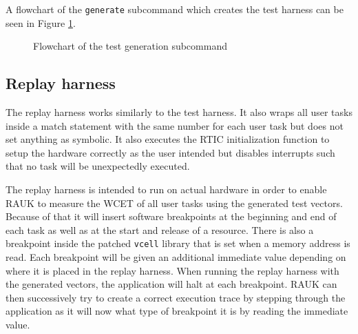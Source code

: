 A flowchart of the \texttt{generate} subcommand which creates the test harness
can be seen in Figure \ref{fig:generatecmd}.
\begin{figure}[H]
    \centering
    \caption{Flowchart of the test generation subcommand}
    \label{fig:generatecmd}
\end{figure}

\subsection{Replay harness}
The replay harness works similarly to the test harness. It also wraps all user
tasks inside a match statement with the same number for each user task but
does not set anything as symbolic. It also executes the RTIC initialization
function to setup the hardware correctly as the user intended but disables
interrupts such that no task will be unexpectedly executed.

The replay harness is intended to run on actual hardware in order to enable
RAUK to measure the WCET of all user tasks using the generated test vectors.
Because of that it will insert software breakpoints at the beginning and end of
each task as well as at the start and release of a resource. There is also a
breakpoint inside the patched \texttt{vcell} library that is set when a memory
address is read. Each breakpoint will be given an additional immediate value
depending on where it is placed in the replay harness. When running the replay
harness with the generated vectors, the application will halt at each
breakpoint. RAUK can then successively try to create a correct execution trace
by stepping through the application as it will now what type of breakpoint it
is by reading the immediate value.


